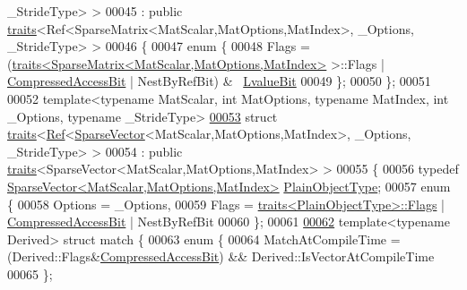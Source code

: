 \begin{DoxyCode}
      \_StrideType> >
00045   : \textcolor{keyword}{public} \hyperlink{struct_eigen_1_1internal_1_1traits}{traits}<Ref<SparseMatrix<MatScalar,MatOptions,MatIndex>, \_Options, \_StrideType> >
00046 \{
00047   \textcolor{keyword}{enum} \{
00048     Flags = (\hyperlink{struct_eigen_1_1internal_1_1traits}{traits<SparseMatrix<MatScalar,MatOptions,MatIndex>}
       >::Flags | \hyperlink{group__flags_gaed0244284da47a2b8661261431173caf}{CompressedAccessBit} | NestByRefBit) & ~\hyperlink{group__flags_gae2c323957f20dfdc6cb8f44428eaec1a}{LvalueBit}
00049   \};
00050 \};
00051 
00052 \textcolor{keyword}{template}<\textcolor{keyword}{typename} MatScalar, \textcolor{keywordtype}{int} MatOptions, \textcolor{keyword}{typename} MatIndex, \textcolor{keywordtype}{int} \_Options, \textcolor{keyword}{typename} \_Str\textcolor{keywordtype}{id}eType>
\hyperlink{struct_eigen_1_1internal_1_1traits_3_01_ref_3_01_sparse_vector_3_01_mat_scalar_00_01_mat_optionsd46b48c0b126a924a96003bc7b99d5a2}{00053} \textcolor{keyword}{struct }\hyperlink{struct_eigen_1_1internal_1_1traits}{traits}<\hyperlink{group___core___module_class_eigen_1_1_ref}{Ref}<\hyperlink{group___sparse_core___module_class_eigen_1_1_sparse_vector}{SparseVector}<MatScalar,MatOptions,MatIndex>, \_Options, \_StrideType> 
      >
00054   : \textcolor{keyword}{public} \hyperlink{struct_eigen_1_1internal_1_1traits}{traits}<SparseVector<MatScalar,MatOptions,MatIndex> >
00055 \{
00056   \textcolor{keyword}{typedef} \hyperlink{group___sparse_core___module_class_eigen_1_1_sparse_vector}{SparseVector<MatScalar,MatOptions,MatIndex>} 
      \hyperlink{group___sparse_core___module_class_eigen_1_1_sparse_vector}{PlainObjectType};
00057   \textcolor{keyword}{enum} \{
00058     Options = \_Options,
00059     Flags = \hyperlink{struct_eigen_1_1internal_1_1traits}{traits<PlainObjectType>::Flags} | 
      \hyperlink{group__flags_gaed0244284da47a2b8661261431173caf}{CompressedAccessBit} | NestByRefBit
00060   \};
00061 
\hyperlink{struct_eigen_1_1internal_1_1traits_3_01_ref_3_01_sparse_vector_3_01_mat_scalar_00_01_mat_options4b581d834744f71c5c7313d6641690e6}{00062}   \textcolor{keyword}{template}<\textcolor{keyword}{typename} Derived> \textcolor{keyword}{struct }match \{
00063     \textcolor{keyword}{enum} \{
00064       MatchAtCompileTime = (Derived::Flags&\hyperlink{group__flags_gaed0244284da47a2b8661261431173caf}{CompressedAccessBit}) && 
      Derived::IsVectorAtCompileTime
00065     \};

\end{DoxyCode}
